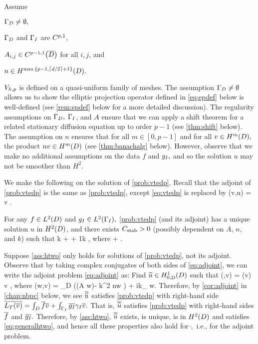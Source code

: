 \label{ass:highp}
Assume
\bit
\item $\Gamma_{D} \neq \emptyset,$
\item $\Gamma_{D}$ and $\Gamma_{I}$ are $C^{p,1}$,
\item $\Aij \in \CpmooDclos$ for all $i,j$, and
\item $n \in \Hfn{}{\max{\set{p-1,\ceil{d/2}+1}}}{D}.$
  \item $V_{h,p}$ is defined on a quasi-uniform family of meshes.
  \eit
  \eas
  The assumption $\Gamma_{D} \neq \emptyset$ allows us to show the elliptic projection operator defined in \cref{eq:epdef} below is well-defined (see \cref{rem:epdef} below for a more detailed discussion). The regularity assumptions on $\Gamma_{D},$ $\Gamma_{I}$, and $A$ ensure that we can apply a shift theorem for a related stationary diffusion equation up to order $p-1$ (see \cref{thm:shift} below). The assumption on $n$ ensures that for all $m \in [0,p-1]$ and for all $v \in \HmD,$ the product $nv \in \HmD$ (see \cref{thm:banachalg} below). However, observe that we make no additional assumptions on the data $f$ and $g_{I},$ and so the solution $u$ may not be smoother than $H^2.$

We make the following  on the solution of \cref{prob:vtedp}. Recall that the adjoint of \cref{prob:vtedp} is the same as \cref{prob:vtedp}, except \cref{eq:vtedp} is replaced by
\beq\label{eq:adjoint}
\aT(v,u) =  \tforall v \in \HozDD.
\eeq

\bas\label{ass:htwo}
For any $f \in \LtD$ and $\gI \in \LtGI,$ \cref{prob:vtedp} (and its adjoint) has a unique solution $u$ in $\HtD$, and there exists $C_{\mathrm{stab}}>0$ (possibly dependent on $A$, $n,$ and $k$) such that
\beq\label{eq:generalhtwo}
k  +  + \frac1k  \leq \CAnk \Cfg,
\eeq
where
\beqs
\Cfg \de {} + \NLtGI{\gI}.
\eeqs
\eas

Suppose \cref{ass:htwo} only holds for solutions of \cref{prob:vtedp}, not its adjoint. Observe that by taking complex conjugates of both sides of \cref{eq:adjoint}, we can write the adjoint problem \cref{eq:adjoint} as: Find $\utilde \in \HozDD$ such that
\beqs
\aTadj(\utilde,v) = \FT(v) \tforall v \in \HozDD,
\eeqs
where
\beqs
\aTadj(w,v) = \int_{D} \big(\mleft(A \grad w\mright)\cdot\grad \vbar - k^2 n\minispace w \vbar\big) + ik\int_{\GI} \trGI w\minispace\trGI \vbar.
\eeqs
Therefore, by \cref{cor:adjoint} in \cref{chap:nbpc} below, we see $\overline{\widetilde{u}}$ satisfies \cref{prob:vtedp} with right-hand side $\overline{L_{T}(\overline{v})} = \int_D \overline{f} \overline{v} + \int_{\Gamma_{I}} \overline{g_{I}} \gamma_{I} \overline{v}.$ That is, $\overline{\widetilde{u}}$ satisfies \cref{prob:vtedp} with right-hand sides $\overline{f}$ and $\overline{g_{I}}.$ Therefore, by \cref{ass:htwo}, $\overline{\widetilde{u}}$ exists, is unique, is in $\HtD$ and satisfies \cref{eq:generalhtwo}, and hence all these properties also hold for $\utilde,$ i.e., for the adjoint problem.
\ere

